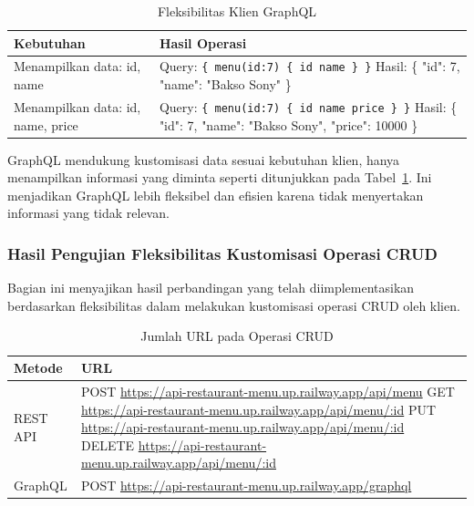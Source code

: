 \documentclass[
 manuscript=article,  %
  layout=publish, 
  year=2024, 
  month= Februari, %
  volume=8,
  number=1 
]{JIKO}
\begin{document}
\begin{table}[hbt!]
  \begin{threeparttable}
    \caption{Fleksibilitas Klien GraphQL}
    \label{tabel:graphql-flex}
    \begin{tabular}{lp{9cm}}
      \toprule
      \textbf{Kebutuhan} & \textbf{Hasil Operasi} \\
      \midrule
      Menampilkan data: id, name & Query: \texttt{\{ menu(id:7) \{ id name \} \}} \newline Hasil: \{ "id": 7, "name": "Bakso Sony" \} \\
      Menampilkan data: id, name, price & Query: \texttt{\{ menu(id:7) \{ id name price \} \}} \newline Hasil: \{ "id": 7, "name": "Bakso Sony", "price": 10000 \} \\
      \bottomrule
    \end{tabular}
  \end{threeparttable}
\end{table}


GraphQL mendukung kustomisasi data sesuai kebutuhan klien, hanya menampilkan informasi yang diminta seperti ditunjukkan pada Tabel~\ref{tabel:graphql-flex}. Ini menjadikan GraphQL lebih fleksibel dan efisien karena tidak menyertakan informasi yang tidak relevan.

\subsubsection{Hasil Pengujian Fleksibilitas Kustomisasi Operasi CRUD}

Bagian ini menyajikan hasil perbandingan yang telah diimplementasikan berdasarkan fleksibilitas dalam melakukan kustomisasi operasi CRUD oleh klien.

\begin{table}[hbt!]
  \begin{threeparttable}
    \caption{Jumlah URL pada Operasi CRUD}
    \label{tabel:crud-url}
    \begin{tabular}{lp{9cm}}
      \toprule
      \textbf{Metode} & \textbf{URL} \\
      \midrule
      REST API & 
      POST \url{https://api-restaurant-menu.up.railway.app/api/menu} \newline
      GET \url{https://api-restaurant-menu.up.railway.app/api/menu/:id} \newline
      PUT \url{https://api-restaurant-menu.up.railway.app/api/menu/:id} \newline
      DELETE \url{https://api-restaurant-menu.up.railway.app/api/menu/:id} \\
      \midrule
      GraphQL & POST \url{https://api-restaurant-menu.up.railway.app/graphql} \\
      \bottomrule
    \end{tabular}
  \end{threeparttable}
\end{table}
\end{document}
